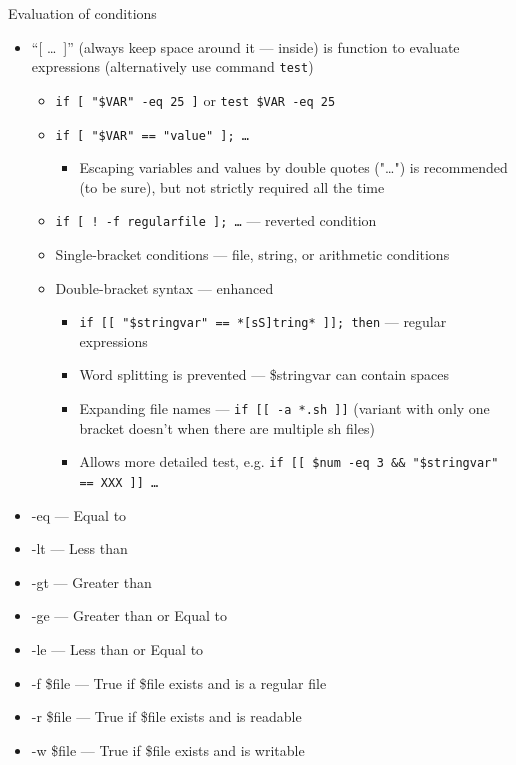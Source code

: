\documentclass[hyperref={bookmarks=true, unicode=true, colorlinks=true, pdftitle={Linux, command line and MetaCentrum}, plainpages=false, pdfauthor={Vojtech Zeisek}, pdfsubject={Course about use of Linux command line, writing shell scripts and using MetaCentrum of CESNET}, pdfcreator={XeLaTeX, http://www.xelatex.org/}, pdfkeywords={Linux, GNU, BASH, shell, command line, MetaCentrum}, linkcolor=Sienna, anchorcolor=black, citecolor=green, filecolor=magenta, menucolor=Sienna, urlcolor=cyan, pdftex}, compress, ucs, xelatex, xcolor=svgnames, 11pt]{beamer}
\begin{document}
\begin{frame}[allowframebreaks]{Evaluation of conditions}
\begin{itemize}
  \item ``[ \ldots~]'' (always keep space around it --- inside) is function to evaluate expressions (alternatively use command \texttt{test})
  \begin{itemize}
    \item \texttt{if [ "\$VAR" -eq 25 ]} or \texttt{test \$VAR -eq 25}
    \item \texttt{if [ "\$VAR" == "value" ]; \ldots}
    \begin{itemize}
      \item Escaping variables and values by double quotes ("\ldots") is recommended (to be sure), but not strictly required all the time
    \end{itemize}
    \item \texttt{if [ ! -f regularfile ]; \ldots} --- reverted condition
    \item Single-bracket conditions --- file, string, or arithmetic conditions
    \item Double-bracket syntax --- enhanced
    \begin{itemize}
      \item \texttt{if [[ "\$stringvar" == *[sS]tring* ]]; then} --- regular expressions
      \item Word splitting is prevented --- \$stringvar can contain spaces
      \item Expanding file names --- \texttt{if [[ -a *.sh ]]} (variant with only one bracket doesn't when there are multiple sh files)
      \item Allows more detailed test, e.g. \texttt{if [[ \$num -eq 3 \&\& "\$stringvar" == XXX ]] \ldots}
    \end{itemize}
  \end{itemize}
  \item -eq --- Equal to
  \item -lt --- Less than
  \item -gt --- Greater than
  \item -ge --- Greater than or Equal to
  \item -le --- Less than or Equal to
  \item -f \$file --- True if \$file exists and is a regular file
  \item -r \$file --- True if \$file exists and is readable
  \item -w \$file --- True if \$file exists and is writable

\end{itemize}
\end{frame}
\end{document}
